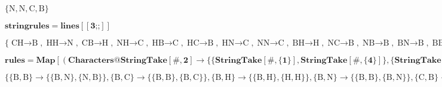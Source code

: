 \documentclass{article}
\begin{document}
\begin{doublespace}
\noindent\(\{\text{N},\text{N},\text{C},\text{B}\}\)
\end{doublespace}

\begin{doublespace}
\noindent\(\pmb{\text{stringrules}=\text{lines}[[3\text{;;}]]}\)
\end{doublespace}

\begin{doublespace}
\noindent\(\{\text{CH$\to $B},\text{HH$\to $N},\text{CB$\to $H},\text{NH$\to $C},\text{HB$\to $C},\text{HC$\to $B},\text{HN$\to $C},\text{NN$\to
$C},\text{BH$\to $H},\text{NC$\to $B},\text{NB$\to $B},\text{BN$\to $B},\text{BB$\to $N},\text{BC$\to $B},\text{CC$\to $N},\text{CN$\to $C}\}\)
\end{doublespace}

\begin{doublespace}
\noindent\(\pmb{\text{rules}=\text{Map}[(\text{Characters}@\text{StringTake}[\#,2]\to \{\{\text{StringTake}[\#,\{1\}],\text{StringTake}[\#,\{4\}]\},\{\text{StringTake}[\#,\{4\}],\text{StringTake}[\#,\{2\}]\}\})\&,\text{stringrules}]\text{//}\text{Sort}}\)
\end{doublespace}

\begin{doublespace}
\noindent\(\{\{\text{B},\text{B}\}\to \{\{\text{B},\text{N}\},\{\text{N},\text{B}\}\},\{\text{B},\text{C}\}\to \{\{\text{B},\text{B}\},\{\text{B},\text{C}\}\},\{\text{B},\text{H}\}\to
\{\{\text{B},\text{H}\},\{\text{H},\text{H}\}\},\{\text{B},\text{N}\}\to \{\{\text{B},\text{B}\},\{\text{B},\text{N}\}\},\{\text{C},\text{B}\}\to
\{\{\text{C},\text{H}\},\{\text{H},\text{B}\}\},\{\text{C},\text{C}\}\to \{\{\text{C},\text{N}\},\{\text{N},\text{C}\}\},\{\text{C},\text{H}\}\to
\{\{\text{C},\text{B}\},\{\text{B},\text{H}\}\},\{\text{C},\text{N}\}\to \{\{\text{C},\text{C}\},\{\text{C},\text{N}\}\},\{\text{H},\text{B}\}\to
\{\{\text{H},\text{C}\},\{\text{C},\text{B}\}\},\{\text{H},\text{C}\}\to \{\{\text{H},\text{B}\},\{\text{B},\text{C}\}\},\{\text{H},\text{H}\}\to
\{\{\text{H},\text{N}\},\{\text{N},\text{H}\}\},\{\text{H},\text{N}\}\to \{\{\text{H},\text{C}\},\{\text{C},\text{N}\}\},\{\text{N},\text{B}\}\to
\{\{\text{N},\text{B}\},\{\text{B},\text{B}\}\},\{\text{N},\text{C}\}\to \{\{\text{N},\text{B}\},\{\text{B},\text{C}\}\},\{\text{N},\text{H}\}\to
\{\{\text{N},\text{C}\},\{\text{C},\text{H}\}\},\{\text{N},\text{N}\}\to \{\{\text{N},\text{C}\},\{\text{C},\text{N}\}\}\}\)
\end{doublespace}
\end{document}
